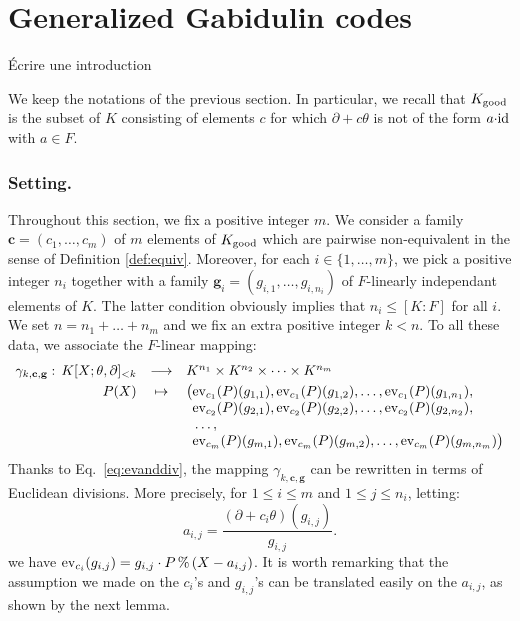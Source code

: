 \documentclass[a4paper]{llncs}
\def\todo#1{{\color{todo} #1}}
\newcommand{\id}{\textrm{\rm id}}
\newcommand{\ev}[1]{\textrm{\rm ev}_{#1}}
\renewcommand{\mod}{\,\%\,}
\newcommand{\bc}{\textbf{c}}
\newcommand{\bg}{\textbf{g}}
\newcommand{\good}{\textrm{\rm good}}
\begin{document}
\section{Generalized Gabidulin codes}

\todo{Écrire une introduction}

We keep the notations of the previous section. In particular, we recall 
that $K_\good$ is the subset of $K$ consisting of elements $c$ for which 
$\partial + c\theta$ is not of the form $a{\cdot}\id$ with $a \in F$.

\subsubsection*{Setting.}

Throughout this section, we fix a positive integer $m$. We consider a 
family $\bc = (c_1, \ldots, c_m)$ of $m$ elements of $K_\good$ which are 
pairwise non-equivalent in the sense of Definition \ref{def:equiv}.
Moreover, for each $i \in \{1,\ldots,m\}$, we pick a positive integer
$n_i$ together with a family $\bg_i = (g_{i,1}, \ldots, g_{i,n_i})$ of 
$F$-linearly independant elements of $K$. The latter condition obviously
implies that $n_i \leq [K:F]$ for all $i$.
We set $n = n_1 + \ldots + n_m$ and we fix an extra positive integer
$k < n$.
To all these data, we associate the $F$-linear mapping:
$$\begin{array}{rcl}
\gamma_{k,\bc,\bg} : \, K[X;\theta,\partial]_{<k} & \longrightarrow 
 & K^{n_1} \times K^{n_2} \times \cdots \times K^{n_m} \smallskip \\
P(X) & \mapsto 
 & \big(\ev{c_1}(P)(g_{1,1}), \ev{c_1}(P)(g_{1,2}), \ldots, \ev{c_1}(P)(g_{1,n_1}), \\
&& \phantom{\big(}\ev{c_2}(P)(g_{2,1}), \ev{c_2}(P)(g_{2,2}), \ldots, \ev{c_2}(P)(g_{2,n_2}), \\
&& \phantom{\big(}\ldots, \\
&& \phantom{\big(}\ev{c_m}(P)(g_{m,1}), \ev{c_m}(P)(g_{m,2}), \ldots, \ev{c_m}(P)(g_{m,n_m})\big)
\end{array}$$
Thanks to Eq.~\eqref{eq:evanddiv}, the mapping $\gamma_{k,\bc,\bg}$
can be rewritten in terms of Euclidean divisions. More precisely,
for $1 \leq i \leq m$ and $1 \leq j \leq n_i$, letting:
\begin{equation}
\label{eq:aij}
a_{i,j} = \frac{(\partial + c_i\theta)(g_{i,j})}{g_{i,j}}.
\end{equation}
we have $\ev{c_i}(g_{i,j}) = g_{i,j} \cdot P \mod (X - a_{i,j})$.
It is worth remarking that the assumption we made on the $c_i$'s
and $g_{i,j}$'s can be translated easily on the $a_{i,j}$, as shown
by the next lemma.
\end{document}
